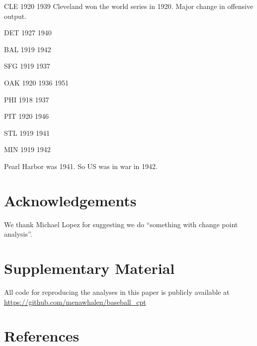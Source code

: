 \documentclass[
  12pt,
]{article}
\begin{document}
CLE 1920 1939 Cleveland won the world series in 1920. Major change in
offensive output.

DET 1927 1940

BAL 1919 1942

SFG 1919 1937

OAK 1920 1936 1951

PHI 1918 1937

PIT 1920 1946

STL 1919 1941

MIN 1919 1942

Pearl Harbor was 1941. So US was in war in 1942.

\hypertarget{acknowledgements}{%
\section*{Acknowledgements}\label{acknowledgements}}

We thank Michael Lopez for suggesting we do ``something with change
point analysis''.

\hypertarget{supplementary-material}{%
\section*{Supplementary Material}\label{supplementary-material}}

All code for reproducing the analyses in this paper is publicly
available at \url{https://github.com/menawhalen/baseball_cpt}

\hypertarget{references}{%
\section*{References}\label{references}}
\end{document}
